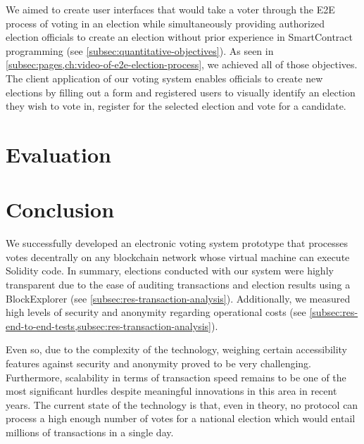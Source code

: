 We aimed to create user interfaces that would take a voter through the \gls{E2E} process of voting in an election while simultaneously providing authorized election officials to create an election without prior experience in \gls{SmartContract} programming (see \cref{subsec:quantitative-objectives}).
As seen in \cref{subsec:pages,ch:video-of-e2e-election-process}, we achieved all of those objectives.
The client application of our voting system enables officials to create new elections by filling out a form and registered users to visually identify an election they wish to vote in, register for the selected election and vote for a candidate.

\section{Evaluation}\label{sec:evalutaion}



\section{Conclusion}\label{sec:conclusion}

We successfully developed an electronic voting system prototype that processes votes decentrally on any blockchain network whose virtual machine can execute Solidity code.
In summary, elections conducted with our system were highly transparent due to the ease of auditing transactions and election results using a \gls{BlockExplorer} (see \cref{subsec:res-transaction-analysis}).
Additionally, we measured high levels of security and anonymity regarding operational costs (see \cref{subsec:res-end-to-end-tests,subsec:res-transaction-analysis}).

Even so, due to the complexity of the technology, weighing certain accessibility features against security and anonymity proved to be very challenging.
Furthermore, scalability in terms of transaction speed remains to be one of the most significant hurdles despite meaningful innovations in this area in recent years.
The current state of the technology is that, even in theory, no protocol can process a high enough number of votes for a national election which would entail millions of transactions in a single day.

